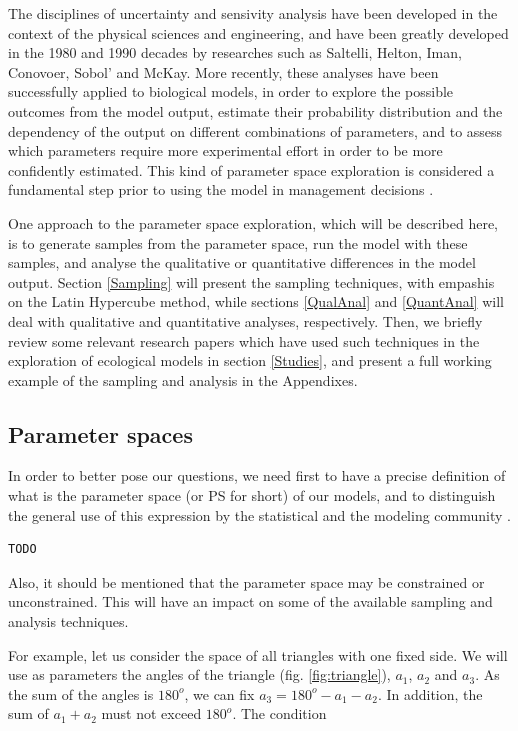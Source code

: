 The disciplines of uncertainty and sensivity analysis have been developed in
the context of the physical sciences and engineering, and have been greatly
developed in the 1980 and 1990 decades by researches such as Saltelli, 
Helton, Iman, Conovoer, Sobol' and McKay. More recently, these analyses
have been 
successfully applied to biological models, in order to explore the possible 
outcomes from the model output, estimate their
probability distribution and the dependency of the output 
on different combinations of parameters, and to assess which parameters 
require more experimental effort in order to be more confidently estimated. 
This kind of parameter space exploration is considered a fundamental step
prior to using the model in management decisions \cite{Bart95}. 

One approach to the parameter space exploration, which will be described here,
is to generate samples from the parameter space, run the model with these 
samples, and analyse the qualitative or quantitative differences in the
model output. Section \ref{Sampling} will present the sampling techniques,
with empashis on the Latin Hypercube method, while sections \ref{QualAnal} and
\ref{QuantAnal} will deal with qualitative and quantitative analyses, 
respectively. Then, we briefly review some relevant research papers which
have used such techniques in the exploration of ecological models in section
\ref{Studies}, and present a full working example of the sampling and analysis
in the Appendixes.

\subsection{Parameter spaces}\label{ps}
In order to better pose our questions, we need first to have a precise 
definition of what is the parameter space (or PS for short)
of our models, and to distinguish the general use of this expression by the
statistical and the modeling community \cite{Ross90}.

\begin{verbatim}
TODO
\end{verbatim}

Also, it should be mentioned that the parameter space may be constrained or
unconstrained. This will have an impact on some of the available sampling 
and analysis techniques.

For example, let us consider the space of all triangles with one fixed side. We
will use as parameters the angles of the triangle (fig. \ref{fig:triangle}),
$a_1$, $a_2$ and $a_3$. As the sum of the angles is $180 ^o$, we can fix 
$a_3 = 180 ^o - a_1 - a_2$. In addition, the sum of $a_1 + a_2$ must not 
exceed $180 ^o$. The condition

